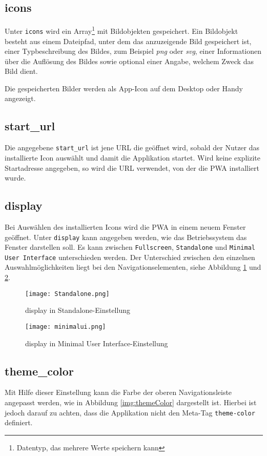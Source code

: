 \subsection{icons}
Unter \texttt{icons} wird ein Array\footnote{Datentyp, das mehrere Werte speichern kann} mit Bildobjekten gespeichert. Ein Bildobjekt besteht aus einem Dateipfad, unter dem das anzuzeigende Bild gespeichert ist, einer Typbeschreibung des Bildes, zum Beispiel \textit{png} oder \textit{svg}, einer Informationen über die Auflösung des Bildes sowie optional einer Angabe, welchem Zweck das Bild dient. 

Die gespeicherten Bilder werden als App-Icon auf dem Desktop oder Handy angezeigt. 

\subsection{start\_url}
Die angegebene \texttt{start\_url} ist jene \ac{URL} die geöffnet wird, sobald der Nutzer das installierte Icon auswählt und damit die Applikation startet. 
Wird keine explizite Startadresse angegeben, so wird die URL verwendet, von der die PWA installiert wurde. 

\subsection{display}

Bei Auswählen des installierten Icons wird die PWA in einem neuem Fenster geöffnet. Unter \texttt{display} kann angegeben werden, wie das Betriebssystem das Fenster darstellen soll. 
Es kann zwischen \texttt{Fullscreen}, \texttt{Standalone} und \texttt{Minimal User Interface} unterschieden werden. 
Der Unterschied zwischen den einzelnen Auswahlmöglichkeiten liegt bei den Navigationselementen, siehe Abbildung \ref{img:Standalone} und \ref{img:minimalui}.

\begin{figure}[!htb]
    \texttt{[image: Standalone.png]}
    \caption{display in \glqq Standalone\grqq{}-Einstellung}
    \label{img:Standalone}
\end{figure}

\begin{figure}
    \texttt{[image: minimalui.png]}
    \caption{display in \glqq Minimal User Interface\grqq{}-Einstellung}
    \label{img:minimalui}
\end{figure}

\subsection{theme\_color}
Mit Hilfe dieser Einstellung kann die Farbe der oberen Navigationsleiste angepasst werden, wie in Abbildung \ref{img:themeColor} dargestellt ist. Hierbei ist jedoch darauf zu achten, dass die Applikation nicht den Meta-Tag \texttt{theme-color} definiert. 


